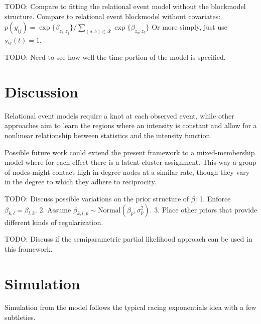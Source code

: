 \documentclass[11pt]{article}
\begin{document}
TODO: Compare to fitting the relational event model without the blockmodel structure.  Compare to relational event blockmodel without covariates: $p(y_{ij}) = \exp\{\beta_{z_i,z_j}\} / \sum_{(a,b) \in \mathcal{R}}\exp\{\beta_{z_{a},z_{b}}\} $
Or more simply, just use $s_{ij}(t) = 1$.

TODO: Need to see how well the time-portion of the model is specified.

\section{Discussion}
Relational event models \cite{Butts2008} require a knot at each observed event, while other approaches \cite{Gunawardana2011} aim to learn the regions where an intensity is constant and allow for a nonlinear relationship between statistics and the intensity function.  

Possible future work could extend the present framework to a mixed-membership model where for each effect there is a latent cluster assignment.  This way a group of nodes might contact high in-degree nodes at a similar rate, though they vary in the degree to which they adhere to reciprocity.


TODO: Discuss possible variations on the prior structure of $\beta$: 1. Enforce $\beta_{k,l} = \beta_{l,k}$. 2. Assume $\beta_{k,l,p} \sim \mbox{Normal}(\beta_p,\sigma_p^2)$. 3. Place other priors that provide different kinds of regularization. 

TODO: Discuss if the semiparametric partial likelihood approach can be used in this framework.


\appendix
\section{Simulation}

Simulation from the model follows the typical racing exponentials idea with a few subtleties.
\end{document}
